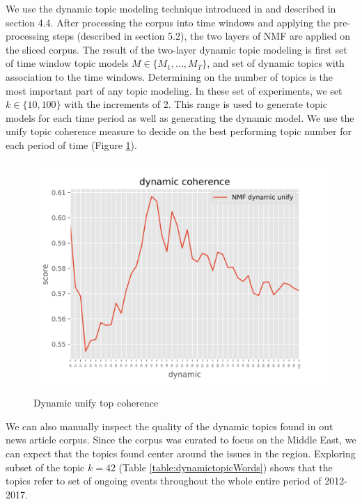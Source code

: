 We use the dynamic topic modeling technique introduced in \cite{Greene2016} and described in section 4.4. After processing the corpus into time windows and applying the pre-processing steps (described in section 5.2), the two layers of NMF are applied on the sliced corpus. The result of the two-layer dynamic topic modeling is first set of time window topic models $M \in \{M_1, ..., M_T\}$, and set of dynamic topics with association to the time windows. 
Determining on the number of topics is the most important part of any topic modeling. In these set of experiments, we set $k \in \{10, 100\}$ with the increments of 2. This range is used to generate topic models for each time period as well as generating the dynamic model. We use the unify topic coherence measure to decide on the best performing topic number for each period of time (Figure \ref{fig:topk_coherence_tc}).

\begin{figure}[H]
\centering
\caption{Dynamic unify top coherence}
\includegraphics[scale=.7]{img/dynamic_coherence_plot.png}
\label{fig:topk_coherence_tc}
\end{figure}




We can also manually inspect the quality of the dynamic topics found in out news article corpus. Since the corpus was curated to focus on the Middle East, we can expect that the topics found center around the issues in the region. Exploring subset of the topic $k = 42$ (Table \ref{table:dynamictopicWords}) shows that the topics refer to set of ongoing events throughout the whole entire period of 2012-2017. 


